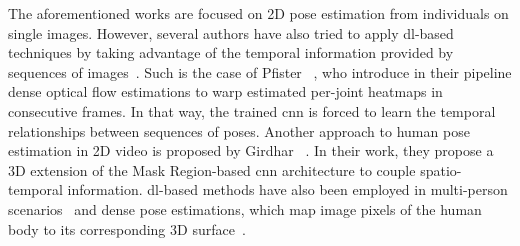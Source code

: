 The aforementioned works are focused on 2D pose estimation from individuals on single images. However, several authors have also tried to apply \gls{dl}-based techniques by taking advantage of the temporal information provided by sequences of images~\cite{Jain2015-zb, Pfister2015-ae, Song2017-fe, Girdhar2018-lx}. Such is the case of Pfister \etal~\cite{Pfister2015-ae}, who introduce in their pipeline dense optical flow estimations to warp estimated per-joint heatmaps in consecutive frames. In that way, the trained \gls{cnn} is forced to learn the temporal relationships between sequences of poses. Another approach to human pose estimation in 2D video is proposed by Girdhar \etal~\cite{Girdhar2018-lx}. In their work, they propose a 3D extension of the Mask Region-based \gls{cnn}  architecture to couple spatio-temporal information. \gls{dl}-based methods have also been employed in multi-person scenarios~\cite{Cao2017-fq, Iqbal2017-nu, Papandreou2017-nk, Insafutdinov2017-zx} and dense pose estimations, which map image pixels of the human body to its corresponding 3D surface~\cite{Alp_Guler2018-rg}.

